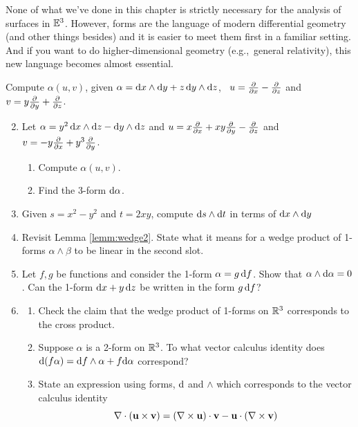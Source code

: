 None of what we've done in this chapter is strictly necessary for the analysis of surfaces in $\mathbb{E}^3$. However, forms are the language of modern differential geometry (and other things besides) and it is easier to meet them first in a familiar setting. And if you want to do higher-dimensional geometry (e.g.,\ general relativity), this new language becomes almost essential.



\begin{exercises}
	\exstart Compute $\alpha(u,v)$, given $\alpha={\mathrm{d} x}\wedge{\mathrm{d}y}+z\,{\mathrm{d} y}\wedge{\mathrm{d}z}$, \ $u=\frac{\partial }{\partial x}-\frac{\partial }{\partial z}$ and $v=y\frac{\partial }{\partial y}+\frac{\partial }{\partial z}$.\vspace{-3pt}


	\begin{enumerate}\setcounter{enumi}{1}
	  \item Let $\alpha=y^2\,{\mathrm{d} x}\wedge{\mathrm{d}z}-{\mathrm{d} y}\wedge{\mathrm{d}z}$ and $u=x\frac{\partial }{\partial x}+xy\frac{\partial }{\partial y}-\frac{\partial }{\partial z}$ and $v=-y\frac{\partial }{\partial x}+y^3\frac{\partial }{\partial y}$.
		\begin{enumerate}
		  \item Compute $\alpha(u,v)$.
		  \item Find the 3-form $\mathrm{d}\alpha$.
		\end{enumerate}
		
		
		\item Given $s=x^2-y^2$ and $t=2xy$, compute ${\mathrm{d} s}\wedge{\mathrm{d}t}$ in terms of ${\mathrm{d} x}\wedge{\mathrm{d}y}$
		
		
		\item Revisit Lemma \ref{lemm:wedge2}. State what it means for a wedge product of 1-forms $\alpha\wedge\beta$ to be linear in the second slot.
		
		
		\item Let $f,g$ be functions and consider the 1-form $\alpha=g\,{\mathrm{d} f}$. Show that $\alpha\wedge\mathrm{d}\alpha=0$. Can the 1-form ${\mathrm{d} x}+y\,{\mathrm{d} z}$ be written in the form $g\,{\mathrm{d} f}$?
		
		
		\item\begin{enumerate}
		  \item Check the claim that the wedge product of 1-forms on $\mathbb{R}^3$ corresponds to the cross product.
		  \item Suppose $\alpha$ is a 2-form on $\mathbb{R}^3$. To what vector calculus identity does $\mathrm{d}(f\alpha)={\mathrm{d} f}\wedge\alpha+f\mathrm{d}\alpha$ correspond?
		  \item State an expression using forms, $\mathrm{d}$ and $\wedge$ which corresponds to the vector calculus identity
		  \[
		 		\nabla\cdot({\mathbf{u}}\times{\mathbf{v}}) =(\nabla\times{\mathbf{u}})\cdot{\mathbf{v}}-{\mathbf{u}}\cdot(\nabla\times{\mathbf{v}})
		 	\]
		\end{enumerate}
		

\end{enumerate}
\end{exercises}
